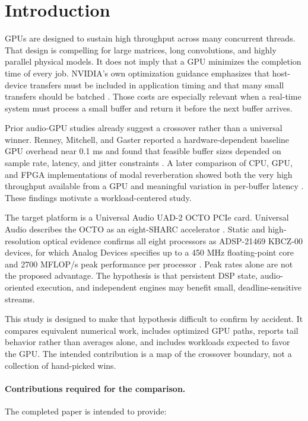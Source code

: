 \documentclass[10pt,twocolumn,twoside]{article}
\begin{document}
\section{Introduction}

GPUs are designed to sustain high throughput across many concurrent threads.
That design is compelling for large matrices, long convolutions, and highly
parallel physical models. It does not imply that a GPU minimizes the completion
time of every job. NVIDIA's own optimization guidance emphasizes that
host-device transfers must be included in application timing and that many
small transfers should be batched \cite{nvidia-best-practices}. Those costs are
especially relevant when a real-time system must process a small buffer and
return it before the next buffer arrives.

Prior audio-GPU studies already suggest a crossover rather than a universal
winner. Renney, Mitchell, and Gaster reported a hardware-dependent baseline GPU
overhead near 0.1 ms and found that feasible buffer sizes depended on sample
rate, latency, and jitter constraints \cite{renney2020}. A later comparison of
CPU, GPU, and FPGA implementations of modal reverberation showed both the very
high throughput available from a GPU and meaningful variation in per-buffer
latency \cite{michon2025}. These findings motivate a workload-centered study.

The target platform is a Universal Audio UAD-2 OCTO PCIe card. Universal Audio
describes the OCTO as an eight-SHARC accelerator \cite{ua-uad2-pcie}. Static and
high-resolution optical evidence confirms all eight processors as
ADSP-21469 KBCZ-00 devices, for which Analog Devices specifies up to a
450 MHz floating-point core and 2700 MFLOP/s peak performance per processor
\cite{adi-adsp21469}. Peak rates alone are not the proposed advantage. The
hypothesis is that persistent DSP state, audio-oriented execution, and
independent engines may benefit small, deadline-sensitive streams.

This study is designed to make that hypothesis difficult to confirm by accident.
It compares equivalent numerical work, includes optimized GPU paths, reports
tail behavior rather than averages alone, and includes workloads expected to
favor the GPU. The intended contribution is a map of the crossover boundary,
not a collection of hand-picked wins.

\paragraph{Contributions required for the comparison.}
The completed paper is intended to provide:
\end{document}
